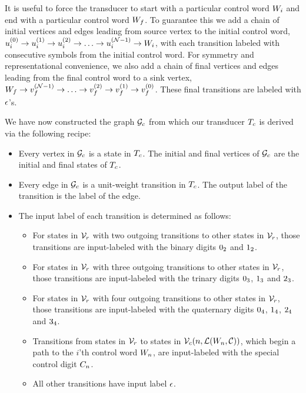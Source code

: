 \documentclass[english]{article}
\begin{document}
It is useful to force the transducer to start with a particular control word $W_i$
and end with a particular control word $W_f$.
To guarantee this we add a chain of initial vertices and edges leading from source vertex to the initial control word,
$u^{(0)}_i \to u^{(1)}_i \to u^{(2)}_i \to \ldots \to u^{({\cal N}-1)}_i \to W_i$,
with each transition labeled with consecutive symbols from the initial control word.
For symmetry and representational convenience, we also add a chain of final vertices and edges leading
from the final control word to a sink vertex,
$W_f \to v^{({\cal N}-1)}_f \to \ldots \to v^{(2)}_f \to v^{(1)}_f \to v^{(0)}_f$.
These final transitions are labeled with $\epsilon$'s.

We have now constructed the graph ${\cal G}_c$ from which our transducer $T_c$
is derived via the following recipe:
\begin{itemize}
\item Every vertex in ${\cal G}_c$ is a state in $T_c$.
The initial and final vertices of ${\cal G}_c$ are the initial and final states of $T_c$.
\item Every edge in ${\cal G}_c$ is a unit-weight transition in $T_c$.
The output label of the transition is the label of the edge.
\item The input label of each transition is determined as follows:
\begin{itemize}
\item For states in ${\cal V}_r$ with two outgoing transitions to other states in ${\cal V}_r$, those transitions are input-labeled with the binary digits $0_2$ and $1_2$.
\item For states in ${\cal V}_r$ with three outgoing transitions to other states in ${\cal V}_r$, those transitions are input-labeled with the trinary digits $0_3$, $1_3$ and $2_3$.
\item For states in ${\cal V}_r$ with four outgoing transitions to other states in ${\cal V}_r$, those transitions are input-labeled with the quaternary digits $0_4$, $1_4$, $2_4$ and $3_4$.
\item Transitions from states in ${\cal V}_r$ to states in ${\cal V}_c(n,{\cal L}(W_n,{\cal C}))$,
which begin a path to the $i$'th control word $W_n$,
are input-labeled with the special control digit $C_{n}$.
\item All other transitions have input label $\epsilon$.
\end{itemize}
\end{itemize}
\end{document}
